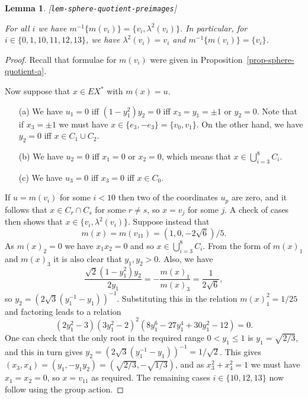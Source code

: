 \documentclass[reqno]{amsart}
\newcommand{\lbl}[1]{\label{#1}\textup{[\texttt{#1}]}\par}
\newcommand{\lbl}{\label}
\newcommand{\lm}        {\lambda}
\newcommand{\rt}        {\sqrt{2}}
\renewcommand{\:}{\colon}
\newtheorem{lemma}[theorem]{Lemma}
\theoremstyle{definition}
\begin{document}
\begin{lemma}\lbl{lem-sphere-quotient-preimages}
 For all $i$ we have $m^{-1}\{m(v_i)\}=\{v_i,\lm^2(v_i)\}$.  In
 particular, for $i\in\{0,1,10,11,12,13\}$, we have
 $\lm^2(v_i)=v_i$ and $m^{-1}\{m(v_i)\}=\{v_i\}$.
\end{lemma}
\begin{proof}
 Recall that formulae for $m(v_i)$ were given in
 Proposition~\ref{prop-sphere-quotient-a}.

 Now suppose that $x\in EX^*$ with $m(x)=u$.
 \begin{itemize}
  \item[(a)] We have $u_1=0$ iff $(1-y_1^2)y_2=0$ iff $x_3=y_1=\pm 1$
   or $y_2=0$.  Note that if $x_3=\pm 1$ we must have
   $x\in\{e_3,-e_3\}=\{v_0,v_1\}$.  On the other hand, we have $y_2=0$
   iff $x\in C_1\cup C_2$.
  \item[(b)] We have $u_2=0$ iff $x_1=0$ or $x_2=0$, which means that
   $x\in\bigcup_{i=3}^8C_i$.
  \item[(c)] We have $u_3=0$ iff $x_3=0$ iff $x\in C_0$.
 \end{itemize}
 If $u=m(v_i)$ for some $i<10$ then two of the coordinates $u_p$ are
 zero, and it follows that $x\in C_r\cap C_s$ for some $r\neq s$, so
 $x=v_j$ for some $j$.  A check of cases then shows that
 $x\in\{v_i,\lm^2(v_i)\}$.  Suppose instead that
 \[ m(x) = m(v_{11})=(1,0,-2\sqrt{6})/5. \]
 As $m(x)_2=0$ we have $x_1x_2=0$ and so $x\in\bigcup_{i=3}^8C_i$.
 From the form of $m(x)_1$ and $m(x)_3$ it is also clear that
 $y_1,y_2>0$.  Also, we have
 \[ \frac{\rt(1-y_1^2)y_2}{2y_1} = -\frac{m(x)_1}{m(x)_3} =
     \frac{1}{2\sqrt{6}},
 \]
 so $y_2=(2\sqrt{3}(y_1^{-1}-y_1))^{-1}$.  Substituting this in the
 relation $m(x)_1^2=1/25$ and factoring leads to a relation
 \[ (2y_1^2-3)(3y_1^2-2)^2(8y_1^6-27y_1^4+30y_1^2-12) = 0. \]
 One can check that the only root in the required range $0<y_1\leq 1$
 is $y_1=\sqrt{2/3}$, and this in turn gives
 $y_2=(2\sqrt{3}(y_1^{-1}-y_1))^{-1}=1/\rt$.  This gives
 $(x_3,x_4)=(y_1,-y_1y_2)=(\sqrt{2/3},-\sqrt{1/3})$, and as
 $x_3^2+x_4^2=1$ we must have $x_1=x_2=0$, so $x=v_{11}$ as required.
 The remaining cases $i\in\{10,12,13\}$ now follow using the group
 action.
\end{proof}
\end{document}
